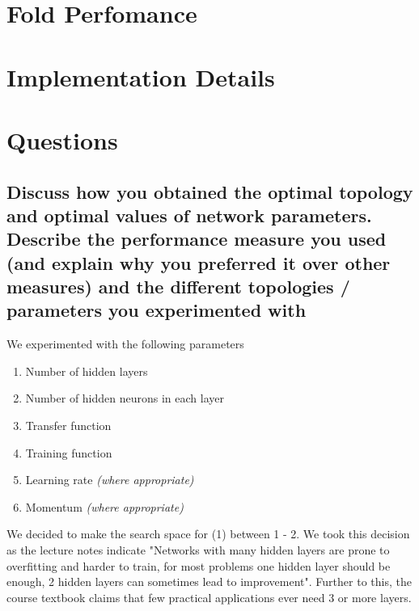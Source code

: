 \documentclass[11pt]{article}
\begin{document}
\section{Fold Perfomance}



\section{Implementation Details}
\section{Questions}

\subsection{Discuss how you obtained the optimal topology and optimal values of network parameters. Describe the performance measure you used (and explain why you preferred it over other measures) and the different topologies / parameters you experimented with}



We experimented with the following parameters
\begin{enumerate}
  \item Number of hidden layers
  \item Number of hidden neurons in each layer
  \item Transfer function
  \item Training function
  \item Learning rate \emph{(where appropriate)}
  \item Momentum \emph{(where appropriate)}
\end{enumerate}

We decided to make the search space for (1) between 1 - 2. We took this decision as the lecture notes indicate "Networks with many hidden layers are prone to overfitting and harder to train, for most problems one hidden layer should be enough, 2 hidden layers can sometimes lead to improvement". Further to this, the course textbook claims that few practical applications ever need 3 or more layers.
\end{document}
